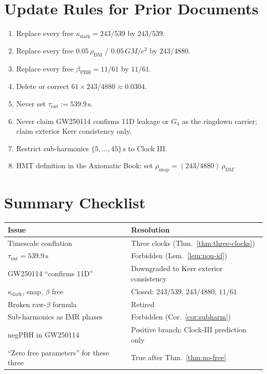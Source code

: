 \section{Update Rules for Prior Documents}
\label{sec:updates}

\begin{enumerate}[label=(\arabic*)]
  \item Replace every free \(\kappa_{\mathrm{dark}} = 243/539\) by \(243/539\).
  \item Replace every free \(0.05\,\rho_{\mathrm{DM}}\) / \(0.05\,GM/c^2\) by
        \(243/4880\).
  \item Replace every free \(\beta_{\mathrm{PBH}} = 11/61\) by \(11/61\).
  \item Delete or correct \(61\times 243/4880\approx 0.0304\).
  \item Never set \(\tau_{\mathrm{ent}}:=539.9\,\mathrm{s}\).
  \item Never claim GW250114 confirms 11D leakage or \(G_4\) as the ringdown
        carrier; claim exterior Kerr consistency only.
  \item Restrict sub-harmonics \(\{5,\ldots,45\}\,\mathrm{s}\) to Clock III.
  \item HMT definition in the Axiomatic Book: set
        \(\rho_{\mathrm{snap}}=(243/4880)\,\rho_{\mathrm{DM}}\).
\end{enumerate}

\section{Summary Checklist}
\label{sec:checklist}

\begin{center}
\begin{tabular}{@{}ll@{}}
\toprule
Issue & Resolution \\
\midrule
Timescale conflation & Three clocks (Thm.~\ref{thm:three-clocks}) \\
\(\tau_{\mathrm{ent}}=539.9\,\mathrm{s}\) & Forbidden (Lem.~\ref{lem:non-id}) \\
GW250114 ``confirms 11D'' & Downgraded to Kerr exterior consistency \\
\(\kappa_{\mathrm{dark}}\), snap, \(\beta\) free & Closed: \(243/539\), \(243/4880\), \(11/61\) \\
Broken raw-\(\beta\) formula & Retired \\
Sub-harmonics as IMR phases & Forbidden (Cor.~\ref{cor:subharm}) \\
negPBH in GW250114 & Positive branch; Clock-III prediction only \\
``Zero free parameters'' for these three & True after Thm.~\ref{thm:no-free} \\
\bottomrule
\end{tabular}
\end{center}

